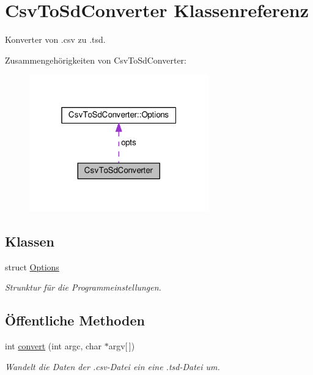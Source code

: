 \hypertarget{classCsvToSdConverter}{\section{Csv\-To\-Sd\-Converter Klassenreferenz}
\label{classCsvToSdConverter}
}


Konverter von .csv zu .tsd.  




Zusammengehörigkeiten von Csv\-To\-Sd\-Converter\-:\nopagebreak
\begin{figure}[H]
\begin{center}
\leavevmode
\includegraphics[width=220pt]{classCsvToSdConverter__coll__graph}
\end{center}
\end{figure}
\subsection*{Klassen}
\begin{DoxyCompactItemize}
\item 
struct \hyperlink{structCsvToSdConverter_1_1Options}{Options}
\begin{DoxyCompactList}\small\item\em Strunktur für die Programmeinstellungen. \end{DoxyCompactList}\end{DoxyCompactItemize}
\subsection*{Öffentliche Methoden}
\begin{DoxyCompactItemize}
\item 
int \hyperlink{classCsvToSdConverter_a226c1dfaf88433cc9edf6570798231ec}{convert} (int argc, char $\ast$argv\mbox{[}$\,$\mbox{]})
\begin{DoxyCompactList}\small\item\em Wandelt die Daten der .csv-\/\-Datei ein eine .tsd-\/\-Datei um. \end{DoxyCompactList}\end{DoxyCompactItemize}
